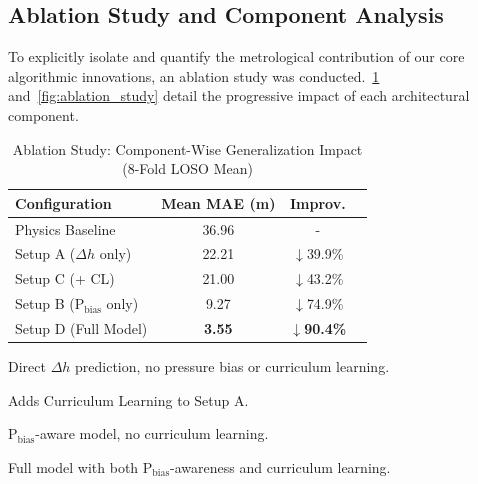 \subsection{Ablation Study and Component Analysis}
\label{subsec:ablation}

To explicitly isolate and quantify the metrological contribution of our core algorithmic innovations, an  ablation study was conducted.~\cref{tab:ablation} and~\cref{fig:ablation_study} detail the progressive impact of each architectural component.

\begin{table}[htbp]
\centering
\begin{threeparttable}
\caption{Ablation Study: Component-Wise Generalization Impact (8-Fold LOSO Mean)}
\label{tab:ablation}
\begin{tabular}{lccc}
\toprule
\textbf{Configuration} & \textbf{Mean MAE (m)} & \textbf{Improv.} \\
\midrule
Physics Baseline & 36.96 & - \\
\midrule
Setup A ($\Delta h$ only)\tnote{a}    & 22.21  & $\downarrow$39.9\% \\
Setup C (+ CL)\tnote{b}               & 21.00  & $\downarrow$43.2\% \\
Setup B (P$_{\text{bias}}$ only)\tnote{c} & 9.27  & $\downarrow$74.9\% \\
\midrule
Setup D (Full Model)\tnote{d}         & \textbf{3.55} & $\boldsymbol{\downarrow}$\textbf{90.4\%} \\
\bottomrule
\end{tabular}
\begin{tablenotes}
    \item[a] Direct $\Delta h$ prediction, no pressure bias or curriculum learning.
    \item[b] Adds Curriculum Learning to Setup A.
    \item[c] P$_{\text{bias}}$-aware model, no curriculum learning.
    \item[d] Full model with both P$_{\text{bias}}$-awareness and curriculum learning.
\end{tablenotes}
\end{threeparttable}
\end{table}

